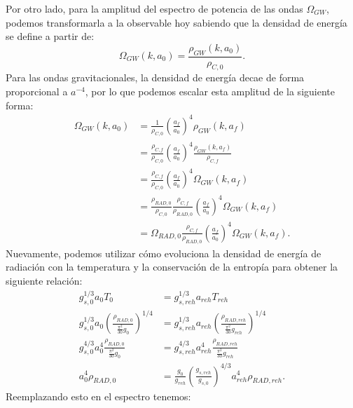 Por otro lado, para la amplitud del espectro de potencia de las ondas $\Omega_{GW}$, podemos transformarla a la observable hoy sabiendo que la densidad de energía se define a partir de:
\begin{equation}
    \Omega_{GW} (k, a_0) = \frac{\rho_{GW} (k, a_0)}{\rho_{C,0}}.
\end{equation}
Para las ondas gravitacionales, la densidad de energía decae de forma proporcional a $a^{-4}$, por lo que podemos escalar esta amplitud de la siguiente forma:
\begin{equation*}
    \begin{split}
        \Omega_{GW} (k, a_0) &= \frac{1}{\rho_{C,0}} \left( \frac{a_f}{a_0} \right)^4 \rho_{GW} \left( k, a_f \right)\\
        &= \frac{\rho_{C,f}}{\rho_{C,0}} \left( \frac{a_f}{a_0} \right)^4 \frac{\rho_{GW} \left( k, a_f \right)}{\rho_{C,f}}\\
        &= \frac{\rho_{C,f}}{\rho_{C,0}} \left( \frac{a_f}{a_0} \right)^4 \Omega_{GW} \left( k, a_f \right)\\
        &= \frac{\rho_{RAD,0}}{\rho_{C,0}} \frac{\rho_{C,f}}{\rho_{RAD,0}} \left( \frac{a_f}{a_0} \right)^4 \Omega_{GW} \left( k, a_f \right)\\
        &= \Omega_{RAD,0} \frac{\rho_{C,f}}{\rho_{RAD,0}} \left( \frac{a_f}{a_0} \right)^4 \Omega_{GW} \left( k, a_f \right).
    \end{split}
\end{equation*}
Nuevamente, podemos utilizar cómo evoluciona la densidad de energía de radiación con la temperatura y la conservación de la entropía para obtener la siguiente relación:
\begin{equation*}
    \begin{split}
        g^{1/3}_{s,0} a_0 T_0 &= g^{1/3}_{s,reh} a_{reh} T_{reh}\\
        g^{1/3}_{s,0} a_0 \left( \frac{\rho_{RAD,0}}{\frac{\pi^2}{30} g_{0}} \right)^{1/4} &= g^{1/3}_{s,reh} a_{reh} \left( \frac{\rho_{RAD,reh}}{\frac{\pi^2}{30} g_{reh}} \right)^{1/4}\\
        g^{4/3}_{s,0} a_0^4 \frac{\rho_{RAD,0}}{\frac{\pi^2}{30} g_{0}} &= g^{4/3}_{s,reh} a_{reh}^4 \frac{\rho_{RAD,reh}}{\frac{\pi^2}{30} g_{reh}}\\
        a_0^4 \rho_{RAD,0} &= \frac{g_0}{g_{reh}} \left( \frac{g_{s,reh}}{g_{s,0}} \right)^{4/3} a_{reh}^4 \rho_{RAD,reh}.
    \end{split}
\end{equation*}
Reemplazando esto en el espectro tenemos:
